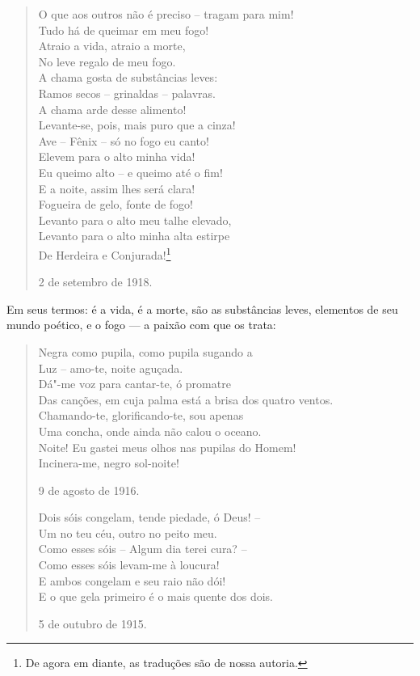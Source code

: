 \begin{verse}
O que aos outros não é preciso -- tragam \qb{}para mim! \\
Tudo há de queimar em meu fogo! \\
Atraio a vida, atraio a morte, \\
No leve regalo de meu fogo. \\[8pt]
A chama gosta de substâncias leves: \\
Ramos secos -- grinaldas -- palavras. \\
A chama arde desse alimento! \\
Levante-se, pois, mais puro que a cinza! \\[8pt]
Ave -- Fênix -- só no fogo eu canto! \\
Elevem para o alto minha vida! \\
Eu queimo alto -- e queimo até o fim! \\
E a noite, assim lhes será clara! \\[8pt]
Fogueira de gelo, fonte de fogo! \\
Levanto para o alto meu talhe elevado, \\
Levanto para o alto minha alta estirpe \\
De Herdeira e Conjurada!\footnote{De agora em diante, as traduções são
  de nossa autoria.}
\begin{flushright}
2 de setembro de 1918.
\end{flushright}
\end{verse}

Em seus termos: é a vida, é a morte, são as substâncias leves, elementos
de seu mundo poético, e o fogo --- a paixão com que os trata:

\begin{verse}
Negra como pupila, como pupila sugando a \\
Luz -- amo-te, noite aguçada. \\[8pt]
Dá"-me voz para cantar-te, ó promatre \\
Das canções, em cuja palma está a brisa \qb{}dos quatro ventos. \\[8pt]
Chamando-te, glorificando-te, sou apenas \\
Uma concha, onde ainda não calou o oceano. \\[8pt]
Noite! Eu gastei meus olhos nas pupilas \qb{}do Homem! \\
Incinera-me, negro sol-noite!
\begin{flushright}
9 de agosto de 1916.
\end{flushright}

Dois sóis congelam, tende piedade, \qb{}ó Deus! -- \\
Um no teu céu, outro no peito meu. \\[8pt]
Como esses sóis -- Algum dia terei cura? -- \\
Como esses sóis levam-me à loucura! \\[8pt]
E ambos congelam e seu raio não dói! \\
E o que gela primeiro é o mais quente \qb{}dos dois.
\begin{flushright}
5 de outubro de 1915.
\end{flushright}
\end{verse}

